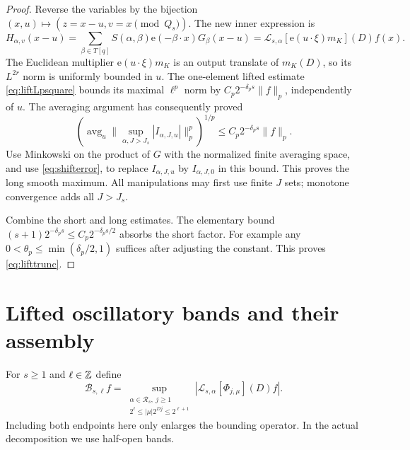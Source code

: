 \documentclass[11pt,oneside]{article}
\theoremstyle{definition}\newtheorem{definition}[theorem]{Definition}
\theoremstyle{remark}\newtheorem{remark}[theorem]{Remark}
\newcommand{\ee}[1]{\mathrm e\!\left(#1\right)}
\newcommand{\av}{\mathop{\mathrm{avg}}}\newcommand{\E}{\mathbb E}\newcommand{\Prb}{\mathbb P}
\newcommand{\Lift}{\mathcal L}\newcommand{\Aop}{\mathcal A}\newcommand{\Dop}{\mathcal D}
\begin{document}
\begin{proof}
Reverse the variables by the bijection
$(x,u)\mapsto(z=x-u,v=x\pmod{Q_s})$.
The new inner expression is
\[
 H_{\alpha,v}(x-u)=\sum_{\beta\in T[q]}S(\alpha,\beta)
                          \ee{-\beta\cdot x}G_\beta(x-u)
 =\Lift_{s,\alpha}[\ee{u\cdot\xi}m_K](D)f(x).
\]
The Euclidean multiplier $\ee{u\cdot\xi}m_K$ is an output translate of
$m_K(D)$, so its $L^{2r}$ norm is uniformly bounded in $u$.
The one-element lifted estimate \eqref{eq:liftLpsquare} bounds its maximal
$\ell^p$ norm by $C_p2^{-\delta_p s}\|f\|_p$, independently of $u$.
The averaging argument has consequently proved
\[
 \left(\av_u\|\sup_{\alpha,J>J_s}|I_{\alpha,J,u}|\|_p^p\right)^{1/p}
             \leq C_p2^{-\delta_p s}\|f\|_p.
\]
Use Minkowski on the product of $G$ with the normalized finite averaging
space, and use \eqref{eq:shifterror}, to replace $I_{\alpha,J,u}$ by
$I_{\alpha,J,0}$ in this bound. This proves the long smooth maximum.
All manipulations may first use finite $J$ sets; monotone convergence adds
all $J>J_s$.

Combine the short and long estimates. The elementary bound
$(s+1)2^{-\delta_p s}\leq C_p2^{-\delta_p s/2}$ absorbs the short factor.
For example any $0<\theta_p\leq\min(\delta_p/2,1)$ suffices after adjusting
the constant. This proves \eqref{eq:lifttrunc}.
\end{proof}

\section{Lifted oscillatory bands and their assembly}\label{sec:bands}
For $s\geq1$ and $\ell\in\mathbb Z$ define
\[
 \mathcal B_{s,\ell}f=
 \sup_{\substack{\alpha\in\mathcal R_s,\ j\geq1\\
                  2^\ell\leq|\mu|2^{Dj}\leq2^{\ell+1}}}
       |\Lift_{s,\alpha}[\Phi_{j,\mu}](D)f|.
\]
Including both endpoints here only enlarges the bounding operator. In the
actual decomposition we use half-open bands.
\end{document}
